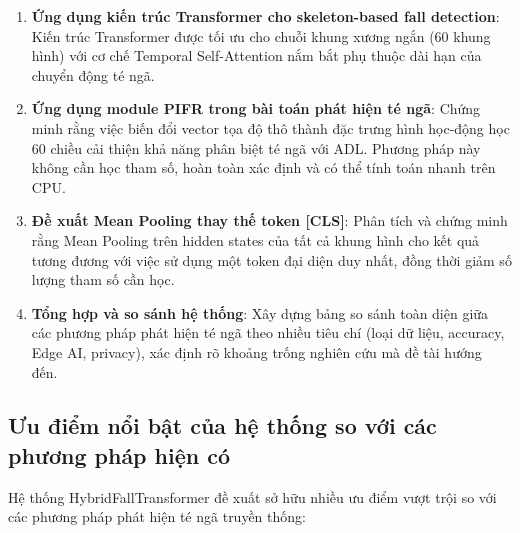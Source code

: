 \begin{enumerate}
    \item \textbf{Ứng dụng kiến trúc Transformer cho skeleton-based fall detection}: Kiến trúc Transformer được tối ưu cho chuỗi khung xương ngắn (60 khung hình) với cơ chế Temporal Self-Attention nắm bắt phụ thuộc dài hạn của chuyển động té ngã.
    
    \item \textbf{Ứng dụng module PIFR trong bài toán phát hiện té ngã}: Chứng minh rằng việc biến đổi vector tọa độ thô thành đặc trưng hình học-động học 60 chiều cải thiện khả năng phân biệt té ngã với ADL. Phương pháp này không cần học tham số, hoàn toàn xác định và có thể tính toán nhanh trên CPU.
    
    \item \textbf{Đề xuất Mean Pooling thay thế token [CLS]}: Phân tích và chứng minh rằng Mean Pooling trên hidden states của tất cả khung hình cho kết quả tương đương với việc sử dụng một token đại diện duy nhất, đồng thời giảm số lượng tham số cần học.
    
    \item \textbf{Tổng hợp và so sánh hệ thống}: Xây dựng bảng so sánh toàn diện giữa các phương pháp phát hiện té ngã theo nhiều tiêu chí (loại dữ liệu, accuracy, Edge AI, privacy), xác định rõ khoảng trống nghiên cứu mà đề tài hướng đến.
\end{enumerate}

\subsection{Ưu điểm nổi bật của hệ thống so với các phương pháp hiện có}
\label{sec:advantages}

Hệ thống HybridFallTransformer đề xuất sở hữu nhiều ưu điểm vượt trội so với các phương pháp phát hiện té ngã truyền thống:

